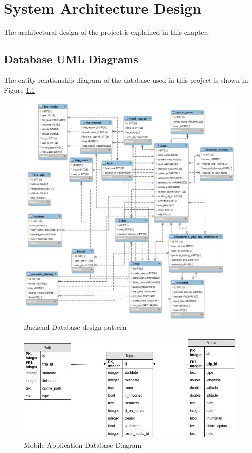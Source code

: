 \chapter{System Architecture Design}
The architectural design of the project is explained in this chapter.

\newpage

\section{Database UML Diagrams}
The entity-relationship diagram of the database used in this project is shown in Figure \ref{fig:dbdesign}
\begin{figure}[!htbp]
\centering
\includegraphics[width=\textwidth]{projectChapters/images/databaseDesign.png}
\caption{Backend Database design
 pattern}
 \label{fig:dbdesign}
\end{figure}
 
\newpage

\begin{figure}[!htbp]
\centering
\includegraphics[width=\textwidth]{projectChapters/images/android_database.png}
\caption{Mobile Application Database Diagram}
\end{figure} 


